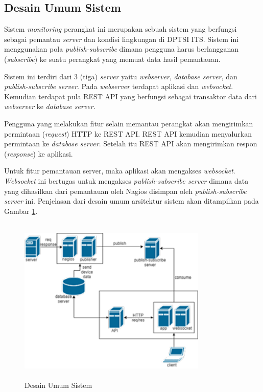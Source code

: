 \subsection{Desain Umum Sistem}
Sistem \textit{monitoring} perangkat ini merupakan sebuah sistem yang berfungsi sebagai pemantau \textit{server} dan kondisi lingkungan di DPTSI ITS. Sistem ini menggunakan pola \textit{publish-subscribe} dimana pengguna harus berlangganan (\textit{subscribe}) ke suatu perangkat yang memuat data hasil pemantauan. 

Sistem ini terdiri dari 3 (tiga) \textit{server} yaitu \textit{webserver}, \textit{database server}, dan \textit{publish-subscribe server}. Pada \textit{webserver} terdapat aplikasi dan \textit{websocket}. Kemudian terdapat pula REST API yang berfungsi sebagai transaktor data dari \textit{webserver} ke \textit{database server}.

Pengguna yang melakukan fitur selain memantau perangkat akan mengirimkan permintaan (\textit{request}) HTTP ke REST API. REST API kemudian menyalurkan permintaan ke \textit{database server}. Setelah itu REST API akan mengirimkan respon (\textit{response}) ke aplikasi.

Untuk fitur pemantauan server, maka aplikasi akan mengakses \textit{websocket}. \textit{Websocket} ini bertugas untuk mengakses \textit{publish-subscribe server} dimana data yang dihasilkan dari pemantauan oleh Nagios disimpan oleh \textit{publish-subscribe server} ini. Penjelasan dari desain umum arsitektur sistem akan ditampilkan pada Gambar \ref{fig:arsiumum}.

\begin{figure}[H]
	\centering
	\includegraphics[width=9cm,height=8cm]{assets/images/diagram-arsi.png}
	\caption{Desain Umum Sistem}
	\label{fig:arsiumum}
\end{figure}


